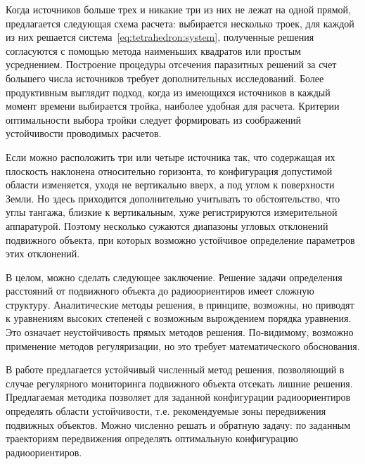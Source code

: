 \documentclass[../main.tex]{subfiles}
\begin{document}
Когда источников больше трех и никакие три из них не лежат на одной прямой, предлагается следующая схема расчета: выбирается несколько троек, для каждой из них решается система~\eqref{eq:tetrahedron:system}, полученные решения согласуются с помощью метода наименьших квадратов или простым усреднением. Построение процедуры отсечения паразитных решений за счет большего числа источников требует дополнительных исследований. Более продуктивным выглядит подход, когда из имеющихся источников в каждый момент времени выбирается тройка, наиболее удобная для расчета. Критерии оптимальности выбора тройки следует формировать из соображений устойчивости проводимых расчетов.

Если можно расположить три или четыре источника так, что содержащая их плоскость наклонена относительно горизонта, то конфигурация допустимой области изменяется, уходя не вертикально вверх, а под углом к поверхности Земли. Но здесь приходится дополнительно учитывать то обстоятельство, что углы тангажа, близкие к вертикальным, хуже регистрируются измерительной аппаратурой. Поэтому несколько сужаются диапазоны угловых отклонений подвижного объекта, при которых возможно устойчивое определение параметров этих отклонений.

В целом, можно сделать следующее заключение. Решение задачи определения расстояний от подвижного объекта до радиоориентиров имеет сложную структуру. Аналитические методы решения, в принципе, возможны, но приводят к уравнениям высоких степеней с возможным вырождением порядка уравнения. Это означает неустойчивость прямых методов решения. По-видимому, возможно применение методов регуляризации, но это требует математического обоснования.

В работе предлагается устойчивый численный метод решения, позволяющий в случае регулярного мониторинга подвижного объекта отсекать лишние решения. Предлагаемая методика позволяет для заданной конфигурации радиоориентиров определять области устойчивости, т.е. рекомендуемые зоны передвижения подвижных объектов. Можно численно решать и обратную задачу: по заданным траекториям передвижения определять оптимальную конфигурацию радиоориентиров.
\end{document}
